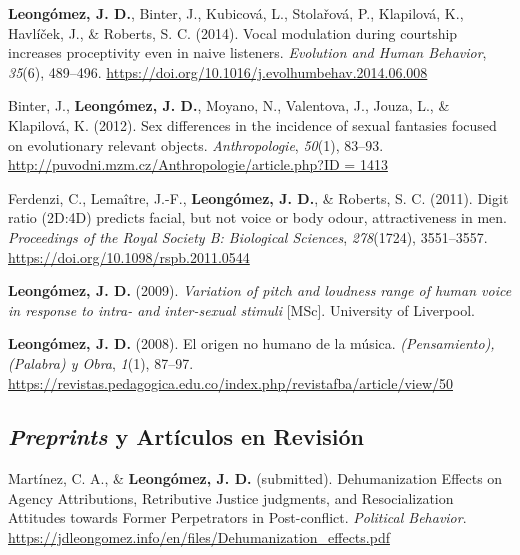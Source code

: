 \documentclass[11pt,a4paper,]{awesome-cv}
\begin{document}
\leavevmode{}%
\textbf{Leongómez, J. D.}, Binter, J., Kubicová, L., Stolařová, P.,
Klapilová, K., Havlíček, J., \& Roberts, S. C. (2014). {Vocal modulation
during courtship increases proceptivity even in naive listeners}.
\emph{Evolution and Human Behavior}, \emph{35}(6), 489--496.
\url{https://doi.org/10.1016/j.evolhumbehav.2014.06.008}

\leavevmode{}%
Binter, J., \textbf{Leongómez, J. D.}, Moyano, N., Valentova, J., Jouza,
L., \& Klapilová, K. (2012). {Sex differences in the incidence of sexual
fantasies focused on evolutionary relevant objects.}
\emph{Anthropologie}, \emph{50}(1), 83--93.
\href{http://puvodni.mzm.cz/Anthropologie/article.php?ID\%20=\%201413}{http://puvodni.mzm.cz/Anthropologie/article.php?ID
= 1413}

\leavevmode{}%
Ferdenzi, C., Lemaître, J.-F., \textbf{Leongómez, J. D.}, \& Roberts, S.
C. (2011). {Digit ratio (2D:4D) predicts facial, but not voice or body
odour, attractiveness in men.} \emph{Proceedings of the Royal Society B:
Biological Sciences}, \emph{278}(1724), 3551--3557.
\url{https://doi.org/10.1098/rspb.2011.0544}

\leavevmode{}%
\textbf{Leongómez, J. D.} (2009). \emph{{Variation of pitch and loudness
range of human voice in response to intra- and inter-sexual stimuli}}
{[}MSc{]}. University of Liverpool.

\leavevmode{}%
\textbf{Leongómez, J. D.} (2008). {El origen no humano de la m{ú}sica}.
\emph{(Pensamiento), (Palabra) y Obra}, \emph{1}(1), 87--97.
\url{https://revistas.pedagogica.edu.co/index.php/revistafba/article/view/50}

\endgroup

\hypertarget{section-1}{%
\subsection{\texorpdfstring{\textbf{\textit{Preprints} y Artículos en Revisión}}{}}\label{section-1}}

\begingroup
\setlength{\parindent}{-0.5in}
\setlength{\leftskip}{0.5in}

\hypertarget{refs_working_paper}{}
\leavevmode{}%
Martínez, C. A., \& \textbf{Leongómez, J. D.} (submitted).
Dehumanization {Effects} on {Agency Attributions}, {Retributive Justice}
judgments, and {Resocialization Attitudes} towards {Former Perpetrators}
in {Post}-conflict. \emph{Political Behavior}.
\url{https://jdleongomez.info/en/files/Dehumanization_effects.pdf}
\end{document}
